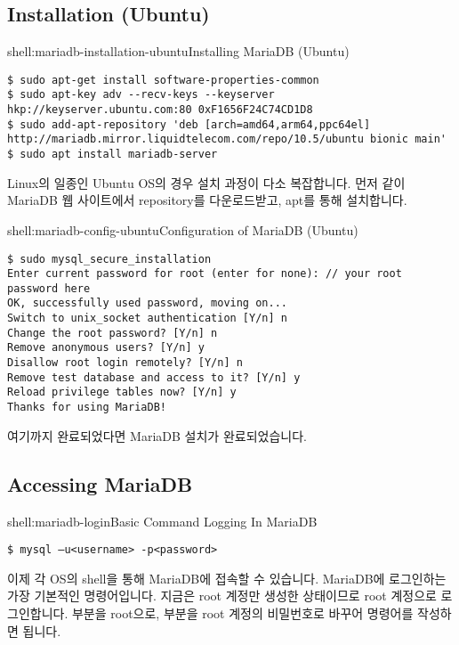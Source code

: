 \subsection*{Installation (Ubuntu)}

\begin{shellenv}{shell:mariadb-installation-ubuntu}{Installing MariaDB (Ubuntu)}\begin{verbatim}
$ sudo apt-get install software-properties-common
$ sudo apt-key adv --recv-keys --keyserver hkp://keyserver.ubuntu.com:80 0xF1656F24C74CD1D8
$ sudo add-apt-repository 'deb [arch=amd64,arm64,ppc64el] http://mariadb.mirror.liquidtelecom.com/repo/10.5/ubuntu bionic main'
$ sudo apt install mariadb-server
\end{verbatim}
\end{shellenv}

Linux의 일종인 Ubuntu OS의 경우 설치 과정이 다소 복잡합니다. 먼저 \와 같이 MariaDB 웹 사이트에서 repository를 다운로드받고, apt를 통해 설치합니다.

\begin{shellenv}{shell:mariadb-config-ubuntu}{Configuration of MariaDB (Ubuntu)}\begin{verbatim}
$ sudo mysql_secure_installation
Enter current password for root (enter for none): // your root password here
OK, successfully used password, moving on...
Switch to unix_socket authentication [Y/n] n
Change the root password? [Y/n] n
Remove anonymous users? [Y/n] y
Disallow root login remotely? [Y/n] n
Remove test database and access to it? [Y/n] y
Reload privilege tables now? [Y/n] y
Thanks for using MariaDB!
\end{verbatim}
\end{shellenv}

여기까지 완료되었다면 MariaDB 설치가 완료되었습니다.

\subsection*{Accessing MariaDB}

\begin{shellenv}{shell:mariadb-login}{Basic Command Logging In MariaDB}\begin{verbatim}
$ mysql –u<username> -p<password>
\end{verbatim}
\end{shellenv}

이제 각 OS의 shell을 통해 MariaDB에 접속할 수 있습니다. \은 MariaDB에 로그인하는 가장 기본적인 명령어입니다. 지금은 root 계정만 생성한 상태이므로 root 계정으로 로그인합니다.  부분을 root으로,  부분을 root 계정의 비밀번호로 바꾸어 명령어를 작성하면 됩니다.

